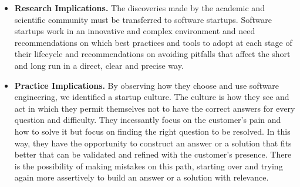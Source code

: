 \documentclass[runningheads]{llncs}
\begin{document}
\begin{itemize}
    \item \textbf{Research Implications.} The discoveries made by the academic and scientific community must be transferred to software startups. Software startups work in an innovative and complex environment and need recommendations on which best practices and tools to adopt at each stage of their lifecycle and recommendations on avoiding pitfalls that affect the short and long run in a direct, clear and precise way.
    \item \textbf{Practice Implications. } By observing how they choose and use software engineering, we identified a startup culture. The culture is how they see and act in which they permit themselves not to have the correct answers for every question and difficulty. They incessantly focus on the customer's pain and how to solve it but focus on finding the right question to be resolved. In this way, they have the opportunity to construct an answer or a solution that fits better that can be validated and refined with the customer's presence. There is the possibility of making mistakes on this path, starting over and trying again more assertively to build an answer or a solution with relevance. 
\end{itemize} 
\end{document}
